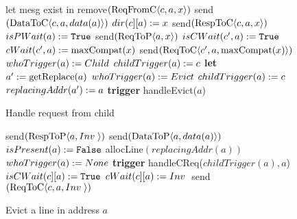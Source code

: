 \begin{figure}
\begin{algorithmic}
   \State let mesg  exist in 
      \If {$!isPWait(a) \AndAnd \forall c, !isCWait(c][a)$}
            \State remove$(\text{ReqFromC$\langle c,a,x\rangle$})$
               \State send$(\text{DataToC$\langle c,a,data(a)\rangle$})$
            \EndIf
            \State $dir(c][a) := x$
            \State send$(\text{RespToC$\langle c,a,x\rangle$})$
         \Else
               \State $isPWait(a) := \texttt{True}$
               \State send$(\text{ReqToP$\langle a,x\rangle$})$
            \EndIf
                  \State $isCWait(c', a) := \texttt{True}$
                  \State $cWait(c', a) := \text{maxCompat}(x)$
                  \State send$(\text{ReqToC$\langle c',a,\text{maxCompat}(x)\rangle$})$
               \EndIf
            \EndFor
            \State \textcolor{trig-color}{$whoTrigger(a) := Child$}
            \State \textcolor{trig-color}{$childTrigger(a) := c$}
         \EndIf
      \EndIf
   \Else
      \State \textbf{let} $a' := \text{getReplace}(a)$
         \State \textcolor{trig-color}{$whoTrigger(a) := Evict$}
         \State \textcolor{trig-color}{$childTrigger(a) := c$}
         \State $replacingAddr(a') := a$
         \State \textcolor{trig-color}{\textbf{trigger} handleEvict($a$)}
      \EndIf
   \EndIf
\EndRule
\end{algorithmic}
\caption{Handle request from child}
\label{alg:handleCReq}
\end{figure}

\begin{figure}
\begin{algorithmic}
   \If {$!isPresent(a) \OrOr \forall c, dir(c][a) = \Inv$}
         \State send$(\text{RespToP$\langle a,\text{$Inv$}\;\rangle$})$
            \State send$(\text{DataToP$\langle a,data(a)\rangle$})$
         \EndIf
      \EndIf
      \State $isPresent(a) := \texttt{False}$
      \State allocLine$(replacingAddr(a))$
      \State \textcolor{trig-color}{$whoTrigger(a) := None$}
      \State \textcolor{trig-color}{\textbf{trigger} handleCReq($childTrigger(a), a$)}
   \Else
      \If {$\forall c, !isCWait(c][a)$}
            \If {$dir(c][a) > \Inv$}
               \State $isCWait(c][a) := \texttt{True}$
               \State $cWait(c][a) := \text{$Inv$}\;$
               \State send$(\text{ReqToC$\langle c,a,\text{$Inv$}\;\rangle$})$
            \EndIf
         \EndFor
      \EndIf
   \EndIf
\EndRule
\end{algorithmic}
\caption{Evict a line in address $a$}
\label{alg:handleEvict}
\end{figure}

